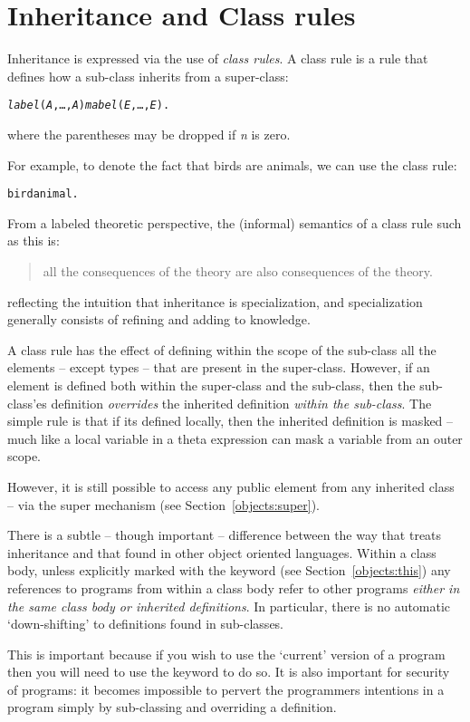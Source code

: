 \section{Inheritance and Class rules}
\label{object:class rule}

Inheritance is expressed via the use of \emph{class rules}. A class rule is a rule that defines how a sub-class inherits from a super-class:
\begin{alltt}
\emph{label}(\emph{A},\ldots,\emph{A\subn}) \classarrow \emph{mabel}(\emph{E},\ldots,\emph{E}).
\end{alltt}
where the parentheses may be dropped if \emph{n} is zero.

For example, to denote the fact that birds are animals, we can use the class rule:
\begin{alltt}
bird \classarrow{} animal.
\end{alltt}
From a labeled theoretic perspective, the (informal) semantics of a class rule such as this is:
\begin{quote}
all the consequences of the  theory are also consequences of the  theory.
\end{quote}
reflecting the intuition that inheritance is specialization, and specialization generally consists of refining and adding to knowledge.

A class rule has the effect of defining within the scope of the sub-class all the elements -- except types -- that are present in the super-class. However, if an element is defined both within the super-class and the sub-class, then the sub-class'es definition \emph{overrides} the inherited definition \emph{within the sub-class}. The simple rule is that if its defined locally, then the inherited definition is masked -- much like a local variable in a theta expression can mask a variable from an outer scope.

However, it is still possible to access any public element from any inherited class -- via the super mechanism (see Section~\vref{objects:super}).

\begin{aside}
There is a subtle -- though important -- difference between the way that \go treats inheritance and that found in other object oriented languages. Within a class body, unless explicitly marked with the  keyword (see Section~\vref{objects:this}) any references to programs from within a class body refer to other programs \emph{either in the same class body or inherited definitions}. In particular, there is no automatic `down-shifting' to definitions found in sub-classes.

This is important because if you wish to use the `current' version of a program then you will need to use the  keyword to do so. It is also important for security of programs: it becomes impossible to pervert the programmers intentions in a program simply by sub-classing and overriding a definition.
\end{aside}

